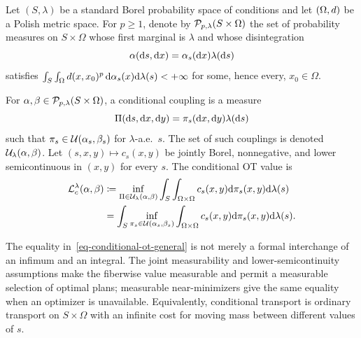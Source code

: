 \begin{defn}\label{def-conditional-ot}
	Let $(S,\lambda)$ be a standard Borel probability space of conditions and let $(\Omega,d)$ be a Polish metric space. For $p\geq1$, denote by $\mathcal{P}_{p,\lambda}(S\times\Omega)$ the set of probability measures on $S\times\Omega$ whose first marginal is $\lambda$ and whose disintegration
	\[
		\alpha(\mathrm{d} s,\mathrm{d} x)=\alpha_s(\mathrm{d} x)\lambda(\mathrm{d} s)
	\]
	satisfies $\int_S\int_\Omega d(x,x_0)^p\,\mathrm{d}\alpha_s(x)\mathrm{d}\lambda(s)<+\infty$ for some, hence every, $x_0\in\Omega$.

	For $\alpha,\beta\in\mathcal{P}_{p,\lambda}(S\times\Omega)$, a conditional coupling is a measure
	\[
		\Pi(\mathrm{d} s,\mathrm{d} x,\mathrm{d} y)
		=
		\pi_s(\mathrm{d} x,\mathrm{d} y)\lambda(\mathrm{d} s)
	\]
	such that $\pi_s\in\mathcal{U}(\alpha_s,\beta_s)$ for $\lambda$-a.e.\ $s$. The set of such couplings is denoted $\mathcal{U}_\lambda(\alpha,\beta)$.
	Let $(s,x,y)\mapsto c_s(x,y)$ be jointly Borel, nonnegative, and lower semicontinuous in $(x,y)$ for every $s$. The conditional OT value is
	\begin{equation}\label{eq-conditional-ot-general}
		\begin{aligned}
		\mathcal{L}_c^\lambda(\alpha,\beta)
		&\coloneqq
		\inf_{\Pi\in\mathcal{U}_\lambda(\alpha,\beta)}
		\int_S\int_{\Omega\times\Omega} c_s(x,y)\mathrm{d}\pi_s(x,y)\mathrm{d}\lambda(s) \\
		&=
		\int_S
		\inf_{\pi_s\in\mathcal{U}(\alpha_s,\beta_s)}
		\int_{\Omega\times\Omega} c_s(x,y)\mathrm{d}\pi_s(x,y)
		\mathrm{d}\lambda(s).
		\end{aligned}
	\end{equation}
\end{defn}

The equality in~\eqref{eq-conditional-ot-general} is not merely a formal interchange of an infimum and an integral. The joint measurability and lower-semicontinuity assumptions make the fiberwise value measurable and permit a measurable selection of optimal plans; measurable near-minimizers give the same equality when an optimizer is unavailable. Equivalently, conditional transport is ordinary transport on $S\times\Omega$ with an infinite cost for moving mass between different values of $s$.

